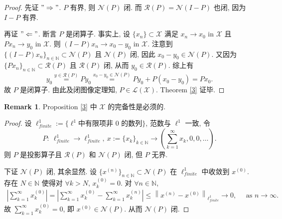 \documentclass[a4paper,11pt]{article}
\theoremstyle{definition}
\newtheorem{remark}[theorem]{Remark}
\begin{document}
\begin{proof}
    先证 $ "\Rightarrow" $. $ P $ 有界, 则 $ \mathcal{N}(P) $ 闭.
    而 $ \mathcal{R}(P) = \mathcal{N}(I-P) $ 也闭, 因为 $ I-P $ 有界.
    
    再证 $ "\Leftarrow" $. 
    断言 $ P $ 是闭算子. 事实上, 设 $ \{x_n\} \subset \mathcal{X} $ 满足 $ x_n \to x_0 \text{ in } \mathcal{X} $ 且 
    $ P x_n \to y_0 \text{ in } \mathcal{X} $.
    则 $ (I - P) x_n \to x_0 - y_0 \text{ in } \mathcal{X} $.
    注意到 $ \{(I - P) x_n\}_{n \in \mathbb{N}} \subset \mathcal{N}(P) $ 且 $ \mathcal{N}(P) $ 闭,
    因此 $ x_0 - y_0 \in \mathcal{N}(P) $. 
    又因为 $ \{P x_n\}_{n \in \mathbb{N}} \subset \mathcal{R}(P) $ 且 $ \mathcal{R}(P) $ 闭,
    从而 $ y_0 \in \mathcal{R}(P) $. 综上有
    $$
        y_0 \overset{y \in \mathcal{R}(P)}{=} Py_0
          \overset{x_0 - y_0 \in \mathcal{N}(P)}{=} Py_0 + P(x_0 - y_0)
          = Px_0.
    $$
    故 $ P $ 是闭算子. 由此及闭图像定理知, $ P \in \mathscr{L}(\mathcal{X}) $. Theorem \ref{3} 证毕.
\end{proof}

\begin{remark}
    Proposition \ref{3} 中 $ \mathcal{X} $ 的完备性是必须的.
\end{remark}

\begin{proof}
    设 $ \ell_{finite}^1 := \{ \ell^1 \text{中有限项非 0 的数列} \} $, 范数与 $ \ell^1 $ 一致, 令
    $$
        P :\ \ell_{finite}^1 \to \ell_{finite}^1,\ 
            x:= \{x_k\}_{k \in \mathbb{N}} \to \left( \sum_{k = 1}^\infty x_k, 0, 0, \ldots \right).
    $$
    则 $ P $ 是投影算子且 $ \mathcal{R}(P) $ 和 $ \mathcal{N}(P) $ 闭, 但 $ P $ 无界. 
    
    下证 $ \mathcal{N}(P) $ 闭, 其余显然.
    设 $ \{x^{(n)}\}_{n \in \mathbb{N}} \subset \mathcal{N}(P) $ 在 $ \ell_{finite}^1 $ 中收敛到 $ x^{(0)} $.
    存在 $ N \in \mathbb{N} $ 使得对 $ \forall k > N $, $ x^{(0)}_k = 0 $.
    对 $ \forall n \in \mathbb{N} $,
    \begin{align*}
        \left| \sum_{k = 1}^\infty x^{(0)}_k \right|
            = \left| \sum_{k = 1}^\infty x^{(0)}_k - \sum_{k = 1}^\infty x^{(n)}_k \right| 
            \leq \left\| x^{(n)} - x^{(0)} \right\|_{\ell_{finite}^1}
            \to 0, \quad \text{ as } n \to \infty.
    \end{align*}
    故 $ \sum_{k = 1}^\infty x^{(0)}_k = 0 $, 即 $ x^{(0)} \in \mathcal{N}(P) $.
    从而 $ \mathcal{N}(P) $ 闭.
\end{proof}
\end{document}
